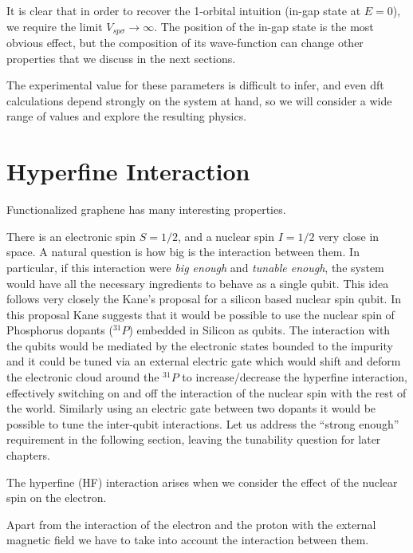 It is clear that in order to recover the 1-orbital intuition (in-gap state at $E=0$), we require the limit $V_{sp\sigma}\to\infty$. The position of the in-gap state is the most obvious effect, but the composition of its wave-function can change other properties that we discuss in the next sections.


The experimental value for these parameters is difficult to infer\cite{}, and even \ac{dft} calculations depend strongly on the system at hand, so we will consider a wide range of values and explore the resulting physics.\\



\section{Hyperfine Interaction}
\label{sec:hyperfine}
Functionalized graphene has many interesting properties. 

There is an electronic spin $S=1/2$, and a nuclear spin $I=1/2$ very close in space. A natural question is how big is the interaction between them. In particular, if this interaction were \emph{big enough} and \emph{tunable enough}, the system would have all the necessary ingredients to behave as a single qubit.
This idea follows very closely the Kane's proposal for a silicon based nuclear spin qubit\cite{Kane1988}. In this proposal Kane suggests that it would be possible to use the nuclear spin of Phosphorus dopants ($^{31}P$) embedded in Silicon as qubits. The interaction with the qubits would be mediated by the electronic states bounded to the impurity and it could be tuned via an external electric gate which would shift and deform the electronic cloud around the $^{31}P$ to increase/decrease the hyperfine interaction, effectively switching on and off the interaction of the nuclear spin with the rest of the world.
Similarly using an electric gate between two dopants it would be possible to tune the inter-qubit interactions.
Let us address the ``strong enough'' requirement in the following section, leaving the tunability question for later chapters. 

The hyperfine (HF) interaction arises when we consider the effect of the nuclear spin on the electron.

Apart from the interaction of the electron and the proton with the external magnetic field we have to take into account the interaction between them.


